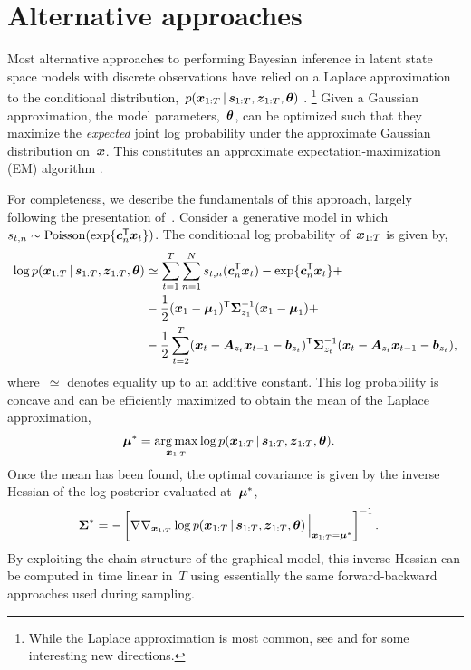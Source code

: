 \section{Alternative approaches}
Most alternative approaches to performing Bayesian inference in latent
state space models with discrete observations have relied on a Laplace
approximation \citep{tierney1986accurate} to the conditional
distribution,~${p(\boldsymbol{x}_{1:T} \,|\, \boldsymbol{s}_{1:T}, \boldsymbol{z}_{1:T}, \boldsymbol{\theta})}$
\citep{Smith-2003, paninski2010new, macke2011empirical}.
\footnote{While the Laplace approximation is most common, see
  \citet{buesing2012spectral} and \citet{pfau2013robust} for some
  interesting new directions.}  Given a Gaussian approximation, the
model parameters,~$\boldsymbol{\theta}$, can be optimized such that they maximize
the \emph{expected} joint log probability under the approximate
Gaussian distribution on~$\boldsymbol{x}$. This constitutes an approximate
expectation-maximization (EM) algorithm \citep{dempster1977maximum}.

\sloppy
For completeness, we describe the fundamentals of this approach,
largely following the presentation of~\citet{macke2011empirical}.
Consider a generative model in which~${s_{t,n} \sim \mathrm{Poisson}(\exp\{\boldsymbol{c}_n^{\mathsf{T}} \boldsymbol{x}_t\})}$.  The conditional log probability of~$\boldsymbol{x}_{1:T}$ is
given by,
\begin{align*}
  \log p(\boldsymbol{x}_{1:T} \,|\, \boldsymbol{s}_{1:T}, \boldsymbol{z}_{1:T}, \boldsymbol{\theta})
  &\simeq \sum_{t=1}^T \sum_{n=1}^N s_{t,n} (\boldsymbol{c}_{n}^{\mathsf{T}} \boldsymbol{x}_{t}) - \exp\{\boldsymbol{c}_n^{\mathsf{T}}\boldsymbol{x}_{t}\} + \\
  &-\frac{1}{2} (\boldsymbol{x}_1 - \boldsymbol{\mu}_1)^{\mathsf{T}} \boldsymbol{\Sigma}_{z_1}^{-1} (\boldsymbol{x}_1 - \boldsymbol{\mu}_1) + \\
  &-\frac{1}{2} \sum_{t=2}^T (\boldsymbol{x}_t - \boldsymbol{A}_{z_t} \boldsymbol{x}_{t-1} - \boldsymbol{b}_{z_t})^{\mathsf{T}}
  \boldsymbol{\Sigma}_{z_t}^{-1} (\boldsymbol{x}_t - \boldsymbol{A}_{z_t} \boldsymbol{x}_{t-1} - \boldsymbol{b}_{z_t}),
\end{align*}
where~$\simeq$ denotes equality up to an additive constant.
This log probability is concave and can be efficiently maximized to
obtain the mean of the Laplace approximation,
\begin{align*}
  \bmu^* &= \argmax_{\bx_{1:T}}
  \log p(\bx_{1:T} \given \bs_{1:T}, \bz_{1:T}, \btheta).
\end{align*}
Once the mean has been found, the optimal covariance is given by
the inverse Hessian of the log posterior evaluated at~$\boldsymbol{\mu}^*$,
\begin{align*}
  \boldsymbol{\Sigma}^* &= - \left[ \nabla \nabla_{\boldsymbol{x}_{1:T}}
      \log p(\boldsymbol{x}_{1:T} \,|\, \boldsymbol{s}_{1:T}, \boldsymbol{z}_{1:T}, \boldsymbol{\theta}) \, \Big|_{\boldsymbol{x}_{1:T}=\boldsymbol{\mu}^*} \right]^{-1}.
\end{align*}
By exploiting the chain structure of the graphical model, this
inverse Hessian can be computed in time linear in~$T$ using essentially
the same forward-backward approaches used during sampling.

